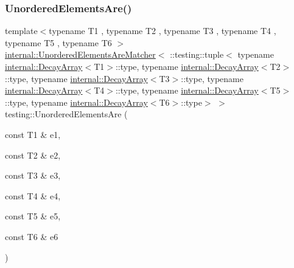 \subsubsection{\texorpdfstring{Unordered\+Elements\+Are()}{UnorderedElementsAre()}\hspace{0.1cm}{\footnotesize\ttfamily [7/11]}}
{\footnotesize\ttfamily template$<$typename T1 , typename T2 , typename T3 , typename T4 , typename T5 , typename T6 $>$ \\
\hyperlink{classtesting_1_1internal_1_1_unordered_elements_are_matcher}{internal\+::\+Unordered\+Elements\+Are\+Matcher}$<$ \+::testing\+::tuple$<$ typename \hyperlink{structtesting_1_1internal_1_1_decay_array}{internal\+::\+Decay\+Array}$<$T1$>$\+::type, typename \hyperlink{structtesting_1_1internal_1_1_decay_array}{internal\+::\+Decay\+Array}$<$T2$>$\+::type, typename \hyperlink{structtesting_1_1internal_1_1_decay_array}{internal\+::\+Decay\+Array}$<$T3$>$\+::type, typename \hyperlink{structtesting_1_1internal_1_1_decay_array}{internal\+::\+Decay\+Array}$<$T4$>$\+::type, typename \hyperlink{structtesting_1_1internal_1_1_decay_array}{internal\+::\+Decay\+Array}$<$T5$>$\+::type, typename \hyperlink{structtesting_1_1internal_1_1_decay_array}{internal\+::\+Decay\+Array}$<$T6$>$\+::type$>$ $>$ testing\+::\+Unordered\+Elements\+Are (\begin{DoxyParamCaption}\item[{const T1 \&}]{e1,  }\item[{const T2 \&}]{e2,  }\item[{const T3 \&}]{e3,  }\item[{const T4 \&}]{e4,  }\item[{const T5 \&}]{e5,  }\item[{const T6 \&}]{e6 }\end{DoxyParamCaption})\hspace{0.3cm}{\ttfamily [inline]}}

\mbox{\label{namespacetesting_add6e16fe24c45e39e92c0d19c04acf11}} 
